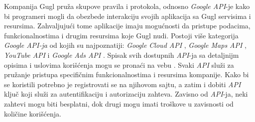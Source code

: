 \documentclass[android.tex]{subfiles}
\begin{document}
Kompanija Gugl pruža skupove pravila i protokola, odnosno \textit{Google API}-je kako bi programeri mogli da obezbede interakciju svojih aplikacija sa Gugl servisima i resursima. Zahvaljujući tome aplikacije imaju mogućnosti da pristupe podacima, funkcionalnostima i drugim resursima koje Gugl nudi. Postoji više kategorija \textit{Google API-ja} od kojih su najpoznatiji: \textit{Google Cloud API} \cite{sajt:googleCloudApis}, \textit{Google Maps API} \cite{sajt:googleMaps}, \textit{YouTube API} \cite{sajt:youtubeApis} i \textit{Google Ads API} \cite{sajt:googleAds}. Spisak svih dostupnih \textit{API}-ja sa detaljnijm opisima i uslovima korišćenja mogu se pronaći na vebu \cite{sajt:googleApiSpisak}. Svaki \textit{API} služi za pružanje pristupa specifičnim funkcionalnostima i resursima kompanije. Kako bi se koristili potrebno je registrovati se na njihovom sajtu, a zatim i dobiti \textit{API} ključ koji služi za autentifikaciju i autorizaciju zahteva. Zavisno od \textit{API}-ja, neki zahtevi mogu biti besplatni, dok drugi mogu imati troškove u zavisnosti od količine korišćenja.  
\end{document}

